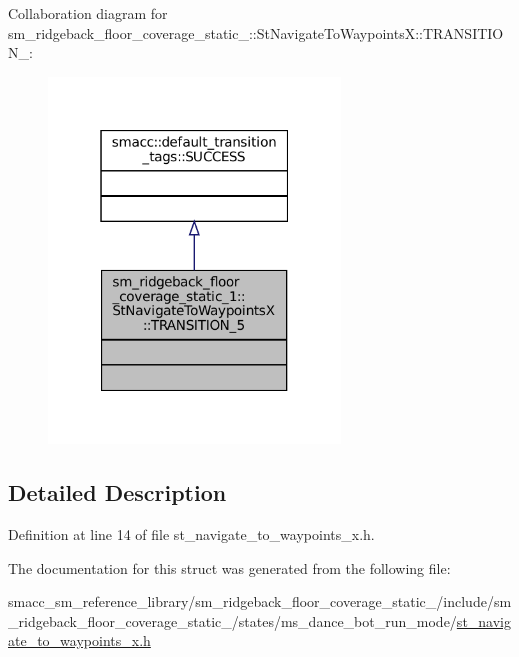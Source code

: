 Collaboration diagram for sm\+\_\+ridgeback\+\_\+floor\+\_\+coverage\+\_\+static\+\_\+:\+:St\+Navigate\+To\+WaypointsX\+:\+:T\+R\+A\+N\+S\+I\+T\+I\+O\+N\+\_\+:
\nopagebreak
\begin{figure}[H]
\begin{center}
\leavevmode
\includegraphics[width=220pt]{structsm__ridgeback__floor__coverage__static__1_1_1StNavigateToWaypointsX_1_1TRANSITION__5__coll__graph}
\end{center}
\end{figure}


\subsection{Detailed Description}


Definition at line 14 of file st\+\_\+navigate\+\_\+to\+\_\+waypoints\+\_\+x.\+h.



The documentation for this struct was generated from the following file\+:\begin{DoxyCompactItemize}
\item 
smacc\+\_\+sm\+\_\+reference\+\_\+library/sm\+\_\+ridgeback\+\_\+floor\+\_\+coverage\+\_\+static\+\_/include/sm\+\_\+ridgeback\+\_\+floor\+\_\+coverage\+\_\+static\+\_/states/ms\+\_\+dance\+\_\+bot\+\_\+run\+\_\+mode/\hyperlink{sm__ridgeback__floor__coverage__static__1_2include_2sm__ridgeback__floor__coverage__static__1_2s3de40240e877d21ebe8f29fac346ff87}{st\+\_\+navigate\+\_\+to\+\_\+waypoints\+\_\+x.\+h}\end{DoxyCompactItemize}
